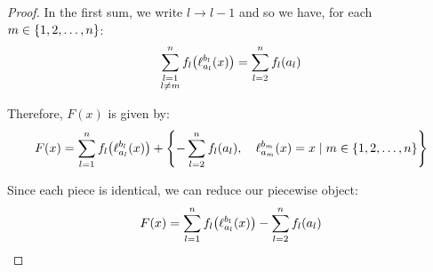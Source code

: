 \begin{proof}
    In the first sum, we write $l\to l-1$ and so we have, for each $m\in\{1,2,\dots,n\}$:
    $$
        \sum_{\substack{l=1\\l\neq m}}^{n}{f_l\paren*{\ell_{a_l}^{b_l}\paren{x}}} = \sum_{l=2}^{n}{f_{l}\paren*{a_{l}}}
    $$

    Therefore, $F(x)$ is given by:
    $$
        F(x) = \sum_{l=1}^{n}{f_l\paren*{\ell_{a_l}^{b_l}\paren{x}}}+\pwobj{-\sum_{l=2}^{n}{f_{l}\paren*{a_{l}}}}{\ell_{a_m}^{b_m}\paren{x}=x}{m\in\br{1,2,\dots,n}}
    $$

    Since each piece is identical, we can reduce our piecewise object:
    $$
        F(x) = \sum_{l=1}^{n}{f_l\paren*{\ell_{a_l}^{b_l}\paren{x}}}-\sum_{l=2}^{n}{f_{l}\paren*{a_{l}}}
    $$
\end{proof}

\newpage